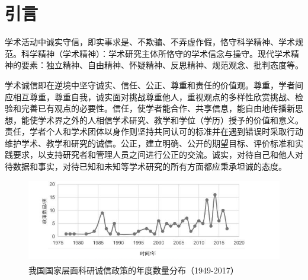 \documentclass[12pt,hyperref,a4paper,UTF8]{ctexart}
\begin{document}
\thispagestyle{empty} %

\newpage
\tableofcontents
\thispagestyle{empty}


\newpage
\setcounter{page}{1}

\section{引言}
学术活动中诚实守信，即实事求是、不欺骗、不弄虚作假，恪守科学精神、学术规范。科学精神（学术精神）：学术研究主体所恪守的学术信念与操守。现代学术精神的要素：独立精神、自由精神、怀疑精神、反思精神、规范观念、批判态度等。

学术诚信即在逆境中坚守诚实、信任、公正、尊重和责任的价值观。尊重，学者间应相互尊重，尊重自我，诚实面对挑战尊重他人，重视观点的多样性欣赏挑战、检验和完善已有观点的必要性。信任，使学者能合作、共享信息，能自由地传播新思想，能使学术界之外的人相信学术研究、教学和学位（学历）授予的价值和意义。责任，学者个人和学术团体以身作则坚持共同认可的标准并在遇到错误时采取行动 维护学术、教学和研究的诚信。公正，建立明确、公开的期望目标、评价标准和实践要求，以支持研究者和管理人员之间进行公正的交流。诚实，对待自己和他人对待数据和事实，对待已知和未知等学术研究的所有方面都应秉承坦诚的态度。

\begin{figure}[!htbp]
  \centering
  \includegraphics[width = 14cm]{figures/fig1.jpg}
    \caption{我国国家层面科研诚信政策的年度数量分布（1949-2017）\textsuperscript{\cite{GongHaoJiYuWenBenWaJueDeWoGuo20022021NianKeYanChengXinZhengCeBianQianTeZhengFenXi2022}}}
    \label{数量分布}
\end{figure}
\end{document}
